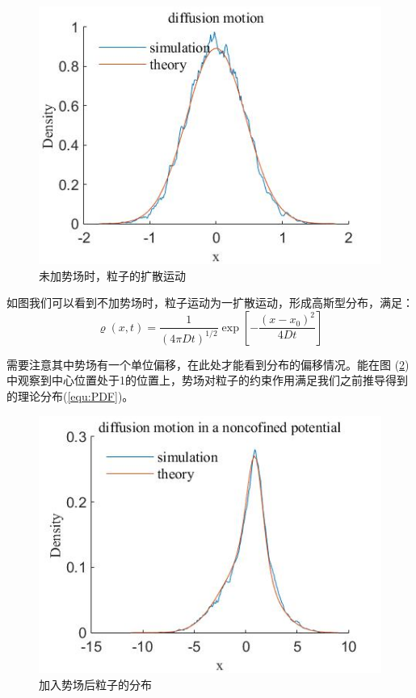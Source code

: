 \begin{figure}[H]
    \centering
    \includegraphics[width=0.8\linewidth]{figs/扩散运动.jpg}
    \caption{未加势场时，粒子的扩散运动}
    \label{fig:sim-no-V}
\end{figure}

如图我们可以看到不加势场时，粒子运动为一扩散运动，形成高斯型分布，满足：
\begin{equation}
    \varrho \left( x,t \right) =\frac{1}{\left( 4\pi Dt \right) ^{1/2}}\exp \left[ -\frac{\left( x-x_0 \right) ^2}{4Dt} \right]
\end{equation}

需要注意其中势场有一个单位偏移，在此处才能看到分布的偏移情况。能在图 (\ref{fig:sim-V})中观察到中心位置处于1的位置上，势场对粒子的约束作用满足我们之前推导得到的理论分布(\ref{equ:PDF})。

\begin{figure}[H]
    \centering
    \includegraphics[width=0.8\linewidth]{figs/势场中的分布.jpg}
    \caption{加入势场后粒子的分布}
    \label{fig:sim-V}
\end{figure}